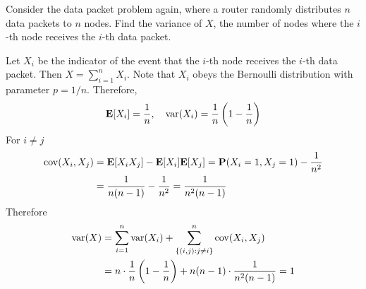 \begin{example}
    Consider the data packet problem again, where a router randomly distributes $n$ data packets to $n$ nodes. Find the variance of $X$, the number of nodes where the $i$-th node receives the $i$-th data packet.
\end{example}
\begin{solution}
    Let $X_i$ be the indicator of the event that the $i$-th node receives the $i$-th data packet. Then $X = \sum_{i=1}^{n} X_i$. Note that $X_i$ obeys the Bernoulli distribution with parameter $p = 1/n$. Therefore, 
    \begin{equation}
        \mathbf{E}[X_i] = \frac{1}{n}, \quad \mathrm{var}(X_i) = \frac{1}{n}\left(1 - \frac{1}{n}\right)
    \end{equation}
    For $i \neq j$
    \begin{equation}
    \begin{aligned}
        \mathrm{cov}(X_i, X_j) &= \mathbf{E}[X_i X_j] - \mathbf{E}[X_i]\mathbf{E}[X_j] = \mathbf{P}(X_i = 1, X_j = 1) - \frac{1}{n^2} \\ 
        &= \frac{1}{n(n-1)} - \frac{1}{n^2} = \frac{1}{n^2(n-1)}
    \end{aligned}
    \end{equation}
    Therefore
    \begin{equation}
    \begin{aligned}
        \mathrm{var}(X) &= \sum_{i=1}^{n} \mathrm{var}(X_i) + \sum_{\{(i,j): j \neq i\}}^{n} \mathrm{cov}(X_i, X_j) \\ 
        &= n \cdot \frac{1}{n}\left(1 - \frac{1}{n}\right) + n(n-1) \cdot \frac{1}{n^2(n-1)} = 1
    \end{aligned}
    \end{equation}
\end{solution}

